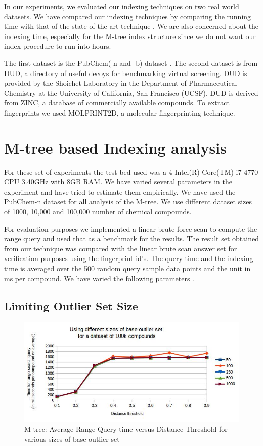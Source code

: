 
In our experiments, we evaluated our indexing techniques on two real world datasets. We have compared our indexing techniques by comparing the running time with that of the state of the art technique  . We are also concerned about the indexing time, especially for the M-tree index structure since we do not want our index procedure to run into hours.

The first dataset is the PubChem(-n and -b) dataset . The second dataset is from DUD, a directory of useful decoys for benchmarking virtual screening. DUD is provided by the Shoichet Laboratory in the Department of Pharmaceutical Chemistry at the University of California, San Francisco (UCSF). DUD is derived from ZINC, a database of commercially available compounds. To extract fingerprints we used MOLPRINT2D, a molecular fingerprinting technique.


\section{M-tree based Indexing analysis}	

For these set of experiments the test bed used was a 4 Intel(R) Core(TM) i7-4770 CPU \@ 3.40GHz with 8GB RAM. We have varied several parameters in the experiment and have tried to estimate them empirically. We have used the PubChem-n dataset for all analysis of the M-tree. We use different dataset sizes of 1000, 10,000 and 100,000 number of chemical compounds.

For evaluation purposes we implemented a linear brute force scan to compute the range query and used that as a benchmark for the results. The result set obtained from our technique was compared with the linear brute scan answer set for verification purposes using the fingerprint id's. The query time and the indexing time is averaged over the 500 random query sample data points and the unit in ms per compound. We have varied the following parameters .


\subsection{Limiting Outlier Set Size }

\begin{figure}[ht]	
\centering
\includegraphics[width=1 \columnwidth]{img/image1.jpg}
\caption{M-tree: Average Range Query time versus Distance Threshold for various sizes of base outlier set}
\label{fig:5.1}
\end{figure}

